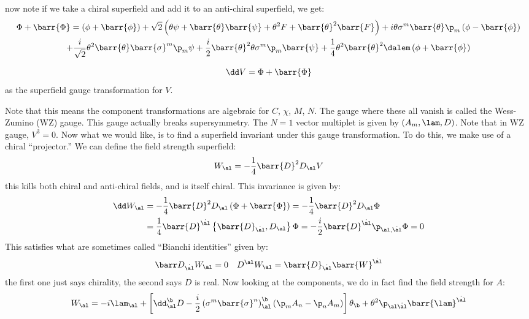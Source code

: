 \documentclass{booc}
\begin{document}
now note if we take a chiral superfield and add it to an anti-chiral superfield,
we get:
\begin{multline}
\Phi + \barr{\Phi} = \left( \phi + \barr{\phi} \right) + 
\sqrt{2}\left( \theta \psi + \barr{\theta}\barr{\psi} + \theta^2 F + \barr{\theta}^2 \barr{F}\right)
+ i\theta \sigma^m \barr{\theta} \p_m \left( \phi - \barr{\phi} \right) 
\\ + \frac{i}{\sqrt{2}} \theta^2 \barr{\theta}\barr{\sigma}^m \p_m \psi + 
\frac{i}{2} \barr{\theta}^2 \theta \sigma^m \p_m \barr{\psi} + 
\frac{1}{4} \theta^2 \barr{\theta}^2 \dalem\left( \phi + \barr{\phi} \right)
\end{multline}

\begin{prop}
\begin{equation}
\dd V = \Phi + \barr{\Phi}
\end{equation}
as the superfield gauge transformation for $V$.
\end{prop}

Note that this means the component transformations are algebraic for $C$,
$\chi$, $M$, $N$. 
The gauge where these all vanish is called the Wess-Zumino (WZ) gauge.
This gauge actually breaks supersymmetry.
The $N = 1$ vector multiplet is given by
$\left( A_m , \lam , D \right)$.
Note that in WZ gauge, $V^3 = 0$.
Now what we would like, is to find a superfield invariant under this gauge transformation. 
To do this, we make use of a chiral ``projector.''
We can define the field strength superfield:
\begin{equation}
W_\al = -\frac{1}{4} \barr{D}^2 D_\al V
\end{equation}
this kills both chiral and anti-chiral fields, and is itself chiral.
This invariance is given by:
\begin{align}
\dd W_\al &= -\frac{1}{4} \barr{D}^2 D_\al
\left( \Phi  +\barr{\Phi} \right) = 
-\frac{1}{4} \barr{D}^2 D_\al \Phi  \\
&= \frac{1}{4} \barr{D}^{\dot{\al}} \left\{ \barr{D}_{\dot{\al}} , D_\al \right\}\Phi = 
-\frac{i}{2} \barr{D}^{\dot{\al}} \p_{\al , \dot{\al}} \Phi = 0
\end{align}
This satisfies what are sometimes called ``Bianchi identities'' given by:
\begin{align}
\barr D_{\dot{\al}}W_\al = 0
&&
D^\al W_\al = \barr{D}_{\dot{\al}} \barr{W}^{\dot{\al}}
\end{align}
the first one just says chirality, the second says $D$ is real.
Now looking at the components, we do in fact find the field strength for $A$:
\begin{equation}
W_{\al} = -i\lam_{\al}
+ \left[ \dd^\b_\al D - \frac{i}{2} \left( \sigma^m \barr{\sigma}^n \right)_\al^\b
\left( \p_mA_n - \p_n A_m \right)\right]\theta_\b + 
\theta^2 \p_{\al \dot{\al}} \barr{\lam}^{\dot{\al}}
\end{equation}
\end{document}
